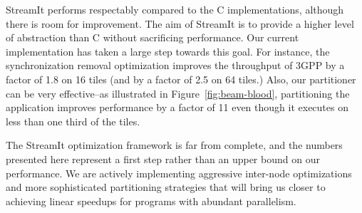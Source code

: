 StreamIt performs respectably compared to the C implementations,
although there is room for improvement.  The aim of StreamIt is to
provide a higher level of abstraction than C without sacrificing
performance.  Our current implementation has taken a large step
towards this goal.  For instance, the synchronization removal
optimization improves the throughput of 3GPP by a factor of 1.8 on 16
tiles (and by a factor of 2.5 on 64 tiles.)  Also, our partitioner can
be very effective--as illustrated in Figure~\ref{fig:beam-blood},
partitioning the \Radar~ application improves performance by a factor
of 11 even though it executes on less than one third of the tiles.

The StreamIt optimization framework is far from complete, and the
numbers presented here represent a first step rather than an upper
bound on our performance.  We are actively implementing aggressive
inter-node optimizations and more sophisticated partitioning
strategies that will bring us closer to achieving linear speedups for
programs with abundant parallelism.



%
%
%

